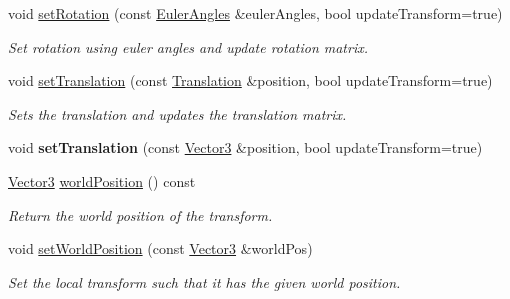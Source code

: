 \begin{Indent}
\begin{DoxyCompactItemize}
\mbox{\label{classrev_1_1_transform_a1ed5536a582b3aff028b7e57771a6360}} 
void \mbox{\hyperlink{classrev_1_1_transform_a1ed5536a582b3aff028b7e57771a6360}{set\+Rotation}} (const \mbox{\hyperlink{classrev_1_1_euler_angles}{Euler\+Angles}} \&euler\+Angles, bool update\+Transform=true)
\begin{DoxyCompactList}\small\item\em Set rotation using euler angles and update rotation matrix. \end{DoxyCompactList}\item 
\mbox{\label{classrev_1_1_transform_a27dcd1a011e0df1afb690bebd7cac4e3}} 
void \mbox{\hyperlink{classrev_1_1_transform_a27dcd1a011e0df1afb690bebd7cac4e3}{set\+Translation}} (const \mbox{\hyperlink{structrev_1_1_translation}{Translation}} \&position, bool update\+Transform=true)
\begin{DoxyCompactList}\small\item\em Sets the translation and updates the translation matrix. \end{DoxyCompactList}\item 
\mbox{\label{classrev_1_1_transform_ab7dd0ded29508d223d255116cbc7d272}} 
void {\bfseries set\+Translation} (const \mbox{\hyperlink{classrev_1_1_vector}{Vector3}} \&position, bool update\+Transform=true)
\item 
\mbox{\label{classrev_1_1_transform_a302dc321858699647c7914d6ea026503}} 
\mbox{\hyperlink{classrev_1_1_vector}{Vector3}} \mbox{\hyperlink{classrev_1_1_transform_a302dc321858699647c7914d6ea026503}{world\+Position}} () const
\begin{DoxyCompactList}\small\item\em Return the world position of the transform. \end{DoxyCompactList}\item 
\mbox{\label{classrev_1_1_transform_a36256f60acb211eaaec1637ddeab9cac}} 
void \mbox{\hyperlink{classrev_1_1_transform_a36256f60acb211eaaec1637ddeab9cac}{set\+World\+Position}} (const \mbox{\hyperlink{classrev_1_1_vector}{Vector3}} \&world\+Pos)
\begin{DoxyCompactList}\small\item\em Set the local transform such that it has the given world position. \end{DoxyCompactList}\item 

\end{DoxyCompactItemize}
\end{Indent}
